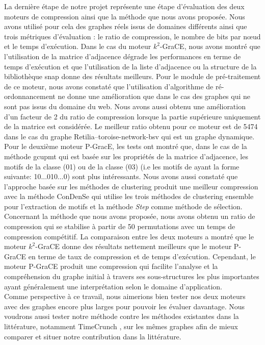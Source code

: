 \documentclass[a4paper,oneside,12pt]{report}
\theoremstyle{definition}
\begin{document}
La dernière étape de notre projet représente une étape d'évaluation des deux moteurs de compression ainsi que la méthode que nous avons proposée. Nous avons utilisé pour cela des graphes réels issus de domaines différents ainsi que trois métriques d'évaluation : le ratio de compression, le nombre de bits par nœud et le temps d'exécution. Dans le cas du moteur $k^2$-GraCE, nous avons montré que l'utilisation de la matrice d'adjacence dégrade les performances en terme de temps d'exécution et que l'utilisation de la liste d'adjacence ou la structure de la bibliothèque \gls{snap} donne des résultats meilleurs. Pour le module de pré-traitement de ce moteur, nous avons constaté que  l'utilisation d'algorithme de ré-ordonnancement  ne donne une amélioration que dans le cas des graphes qui ne sont pas issus du domaine du web. Nous avons aussi obtenu une amélioration d'un facteur de 2 du ratio de compression lorsque la partie supérieure uniquement de la matrice est considérée. Le meilleur ratio obtenu pour ce moteur est de 5474 dans le cas du graphe Retilia--toroise-network-bsv qui est un graphe dynamique.
Pour le deuxième moteur P-GracE, les tests ont montré que, dans le cas de la méthode \gls{gcupmt} qui est basée sur les propriétés de la matrice d'adjacence, les motifs de la classe (01) ou de la classe (03) (i.e les motifs de ayant la forme suivante: 10...010...0) sont plus intéressants. Nous avons aussi constaté que l'approche basée sur les méthodes de clustering produit une meilleur compression avec la méthode \gls{ConDenSe} qui utilise les trois méthodes de clustering ensemble pour l'extraction de motifs et la méthode \textit{Step} comme méthode de sélection. Concernant la méthode que nous avons proposée, nous avons obtenu un ratio de compression qui se stabilise à partir de 50 permutations avec un temps de compression compétitif.  
La comparaison entre les deux moteurs a montré que le moteur $k^2$-GraCE donne des résultats nettement meilleurs que le moteur P-GraCE en terme de taux de compression et de temps d'exécution. Cependant, le moteur P-GraCE produit une compression qui facilite l'analyse et la compréhension du graphe initial à travers ses sous-structures les plus importantes ayant généralement une interprétation selon le domaine d'application.  \\
	
	
Comme perspective à ce travail, nous aimerions bien tester nos deux moteurs avec des graphes encore plus larges pour pouvoir les évaluer davantage. Nous voudrons aussi tester notre méthode contre les méthodes existantes dans la littérature, notamment TimeCrunch \citep{shah2015timecrunch}, sur les mêmes graphes afin de mieux comparer et situer notre contribution dans la littérature.
\end{document}
